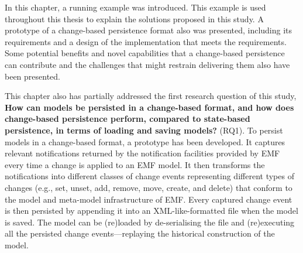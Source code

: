 In this chapter, a running example was introduced. This example is used throughout this thesis to explain the solutions proposed in this study. A prototype of a change-based persistence format also was presented, including its requirements and a design of the implementation that meets the requirements. Some potential benefits and novel capabilities that a change-based persistence can contribute and the challenges that might restrain delivering them also have been presented.

This chapter also has partially addressed the first research question of this study, \textbf{How can models be persisted in a change-based format, and how does change-based persistence perform, compared to state-based persistence, in terms of loading and saving models?} (RQ1). To persist models in a change-based format, a prototype has been developed. It captures relevant notifications returned by the notification facilities provided by EMF every time a change is applied to an EMF model. It then transforms the notifications into different classes of change events representing different types of changes (e.g., set, unset, add, remove, move, create, and delete) that conform to the model and meta-model infrastructure of EMF. Every captured change event is then persisted by appending it into an XML-like-formatted file when the model is saved. The model can be (re)loaded by de-serialising the file and (re)executing all the persisted change events—replaying the historical construction of the model.

